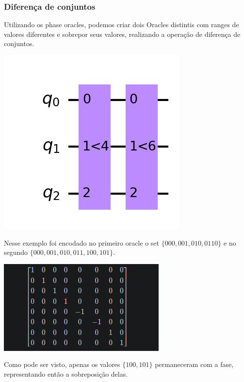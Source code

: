 \documentclass{article}
\begin{document}
\subsubsection{Diferença de conjuntos}

Utilizando os phase oracles, podemos criar dois Oracles distintis com ranges de valores diferentes e sobrepor seus valores, realizando a operação de diferença de conjuntos.

\begin{center}
	\includegraphics[scale=0.3]{less_than.png}
	\label{fig:less-than-circuit}
\end{center}

Nesse exemplo foi encodado no primeiro oracle o set $\{000, 001, 010, 0110\}$ e no segundo $\{000, 001, 010, 011, 100, 101\}$.

\begin{center}
	\includegraphics[scale=0.5]{less_than_unitary.png}
	\label{fig:less-than-circuit-unitary}
\end{center}

Como pode ser visto, apenas os valores $\{100, 101\}$ permaneceram com a fase, representando então a sobreposição delas.
\end{document}
